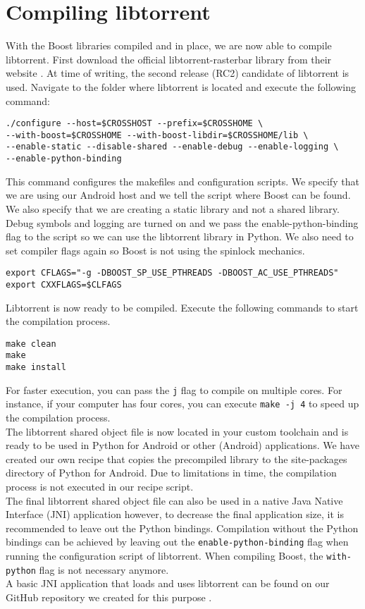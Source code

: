 \section{Compiling libtorrent}
	With the Boost libraries compiled and in place, we are now able to compile libtorrent. First download the official libtorrent-rasterbar library from their website \cite{libtorrentrasterbar}. At time of writing, the second release (RC2) candidate of libtorrent is used. Navigate to the folder where libtorrent is located and execute the following command:
	\begin{lstlisting}
./configure --host=$CROSSHOST --prefix=$CROSSHOME \
--with-boost=$CROSSHOME --with-boost-libdir=$CROSSHOME/lib \
--enable-static --disable-shared --enable-debug --enable-logging \
--enable-python-binding
	\end{lstlisting}
	This command configures the makefiles and configuration scripts. We specify that we are using our Android host and we tell the script where Boost can be found. We also specify that we are creating a static library and not a shared library. Debug symbols and logging are turned on and we pass the enable-python-binding flag to the script so we can use the libtorrent library in Python. We also need to set compiler flags again so Boost is not using the spinlock mechanics.
	\begin{lstlisting}
export CFLAGS="-g -DBOOST_SP_USE_PTHREADS -DBOOST_AC_USE_PTHREADS"
export CXXFLAGS=$CLFAGS
	\end{lstlisting}
	Libtorrent is now ready to be compiled. Execute the following commands to start the compilation process.
	\begin{lstlisting}
make clean
make
make install
	\end{lstlisting}
	For faster execution, you can pass the \texttt{j} flag to compile on multiple cores. For instance, if your computer has four cores, you can execute \texttt{make -j 4} to speed up the compilation process.\\
	The libtorrent shared object file is now located in your custom toolchain and is ready to be used in Python for Android or other (Android) applications. We have created our own recipe that copies the precompiled library to the site-packages directory of Python for Android. Due to limitations in time, the compilation process is not executed in our recipe script.\\
	The final libtorrent shared object file can also be used in a native Java Native Interface (JNI) application however, to decrease the final application size, it is recommended to leave out the Python bindings. Compilation without the Python bindings can be achieved by leaving out the \texttt{enable-python-binding} flag when running the configuration script of libtorrent. When compiling Boost, the \texttt{with-python} flag is not necessary anymore.\\
	A basic JNI application that loads and uses libtorrent can be found on our GitHub repository we created for this purpose \cite{hellolibtorrentgithub}.